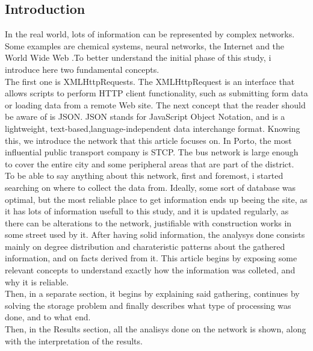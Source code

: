 \documentclass[12pt]{article}
\begin{document}
\begin{multicols}{2}
\section{Introduction}
In the real world, lots of information can be represented by complex networks. Some examples are chemical systems, neural networks, the Internet and the World Wide Web \cite{boccaletti2006complex}.To better understand the initial phase of this study, i introduce here two fundamental concepts.\\
The first one is XMLHttpRequests. The XMLHttpRequest is an interface that allows scripts to perform HTTP client functionality, such as submitting form data or loading data from a remote Web site\cite{van2007xmlhttprequest}.
The next concept that the reader should be aware of is JSON. JSON stands for JavaScript Object Notation, and is a lightweight, text-based,language-independent data interchange format\cite{crockford2006application}. Knowing this, we introduce the network that this article focuses on.
In Porto, the most influential public transport company is STCP. The bus network is large enough to cover the entire city and some peripheral areas that are part of the district.\\
To be able to say anything about this network, first and foremost, i started searching on where to collect the data from. Ideally, some sort of database was optimal, but the most reliable place to get information ends up beeing the site, as it has lots of information usefull to this study, and it is updated regularly, as there can be alterations to the network, justifiable with construction works in some street used by it.
After having solid information, the analysys done consists mainly on degree distribution and charateristic patterns about the gathered information, and on facts derived from it.
This article begins by exposing some relevant concepts to understand exactly how the information was colleted, and why it is reliable.\\
Then, in a separate section, it begins by explaining said gathering, continues by solving the storage problem and finally describes what type of processing was done, and to what end.\\
Then, in the Results section, all the analisys done on the network is shown, along with the interpretation of the results.


\end{multicols}
\end{document}
